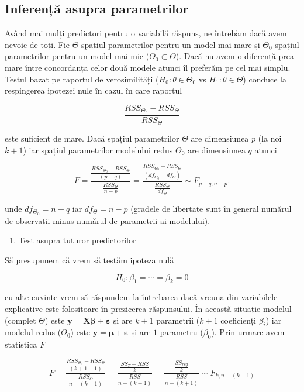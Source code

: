\documentclass[]{article}
\providecommand{\tightlist}{%
  \setlength{\itemsep}{0pt}\setlength{\parskip}{0pt}}
\begin{document}
\subsection{Inferență asupra
parametrilor}\label{inferenta-asupra-parametrilor}

Având mai mulți predictori pentru o variabilă răspuns, ne întrebăm dacă
avem nevoie de toți. Fie \(\Theta\) spațiul parametrilor pentru un model
mai mare și \(\Theta_0\) spațiul parametrilor pentru un model mai mic
(\(\Theta_0\subset \Theta\)). Dacă nu avem o diferență prea mare între
concordanța celor două modele atunci îl preferăm pe cel mai simplu.
Testul bazat pe raportul de verosimilități (\(H_0: \theta\in \Theta_0\)
vs \(H_1: \theta\in\Theta\)) conduce la respingerea ipotezei nule în
cazul în care raportul

\[
\frac{RSS_{\Theta_0}-RSS_{\Theta}}{RSS_{\Theta}}
\]

este suficient de mare. Dacă spațiul parametrilor \(\Theta\) are
dimensiunea \(p\) (la noi \(k+1\)) iar spațiul parametrilor modelului
redus \(\Theta_0\) are dimensiunea \(q\) atunci

\[
F = \frac{\frac{RSS_{\Theta_0}-RSS_{\Theta}}{(p-q)}}{\frac{RSS_{\Theta}}{n-p}} = \frac{\frac{RSS_{\Theta_0}-RSS_{\Theta}}{(df_{\Theta_0}-df_{\Theta})}}{\frac{RSS_{\Theta}}{df_{\Theta}}} \sim F_{p-q,n-p}.
\]

unde \(df_{\Theta_0}=n-q\) iar \(df_{\Theta} = n-p\) (gradele de
libertate sunt în general numărul de observații minus numărul de
parametrii ai modelului).

\begin{enumerate}
\def\labelenumi{\alph{enumi})}
\tightlist
\item
  Test asupra tuturor predictorilor
\end{enumerate}

Să presupunem că vrem să testăm ipoteza nulă

\[
H_0: \beta_1 = \cdots = \beta_k = 0
\]

cu alte cuvinte vrem să răspundem la întrebarea dacă vreuna din
variabilele explicative este folositoare în prezicerea răspunsului. În
această situație modelul (complet \(\Theta\)) este
\(\boldsymbol y = \boldsymbol X\boldsymbol \beta+\boldsymbol\varepsilon\)
și are \(k+1\) parametrii (\(k+1\) coeficienți \(\beta_i\)) iar modelul
redus (\(\Theta_0\)) este
\(\boldsymbol y = \boldsymbol \mu+\boldsymbol\varepsilon\) și are \(1\)
parametru (\(\beta_0\)). Prin urmare avem statistica \(F\)

\[
F = \frac{\frac{RSS_{\Theta_0}-RSS_{\Theta}}{(k+1-1)}}{\frac{RSS_{\Theta}}{n-(k+1)}} = \frac{\frac{SS_{T}-RSS}{k}}{\frac{RSS}{n-(k+1)}}= \frac{\frac{SS_{reg}}{k}}{\frac{RSS}{n-(k+1)}}\sim F_{k,n-(k+1)}
\]
\end{document}
